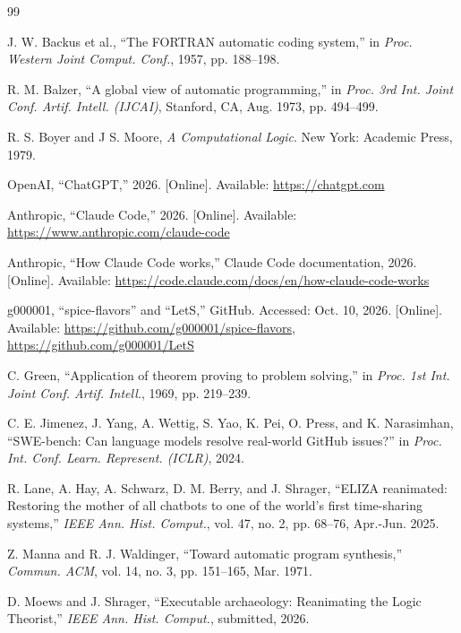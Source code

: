 \documentclass[11pt]{article}
\begin{document}
\begin{thebibliography}{99}

 J. W. Backus et al., ``The FORTRAN
  automatic coding system,'' in \textit{Proc. Western Joint
  Comput. Conf.}, 1957, pp. 188--198.

 R. M. Balzer, ``A global view of automatic
  programming,'' in \textit{Proc. 3rd Int. Joint Conf. Artif. Intell.
  (IJCAI)}, Stanford, CA, Aug. 1973, pp. 494--499.

 R. S. Boyer and J S. Moore, \textit{A
  Computational Logic}. New York: Academic Press, 1979.

 OpenAI, ``ChatGPT,'' 2026. [Online]. Available:
  \url{https://chatgpt.com}

 Anthropic, ``Claude Code,'' 2026. [Online]. Available:
  \url{https://www.anthropic.com/claude-code}

 Anthropic, ``How Claude Code works,''
  Claude Code documentation, 2026. [Online]. Available:
  \url{https://code.claude.com/docs/en/how-claude-code-works}

 g000001, ``spice-flavors'' and ``LetS,'' GitHub.
  Accessed: Oct. 10, 2026. [Online]. Available:
  \url{https://github.com/g000001/spice-flavors},
  \url{https://github.com/g000001/LetS}

 C. Green, ``Application of theorem proving to
  problem solving,'' in \textit{Proc. 1st Int. Joint Conf. Artif.
  Intell.}, 1969, pp. 219--239.

 C. E. Jimenez, J. Yang, A. Wettig,
  S. Yao, K. Pei, O. Press, and K. Narasimhan, ``SWE-bench: Can
  language models resolve real-world GitHub issues?'' in
  \textit{Proc. Int. Conf. Learn. Represent. (ICLR)}, 2024.

 R. Lane, A. Hay, A. Schwarz, D. M. Berry, and
  J. Shrager, ``ELIZA reanimated: Restoring the mother of all chatbots
  to one of the world's first time-sharing systems,'' \textit{IEEE
  Ann. Hist. Comput.}, vol. 47, no. 2, pp. 68--76, Apr.-Jun. 2025.

 Z. Manna and R. J. Waldinger, ``Toward
  automatic program synthesis,'' \textit{Commun. ACM}, vol. 14, no. 3,
  pp. 151--165, Mar. 1971.

 D. Moews and J. Shrager, ``Executable
  archaeology: Reanimating the Logic Theorist,'' \textit{IEEE Ann. Hist.
  Comput.}, submitted, 2026.


\end{thebibliography}
\end{document}
